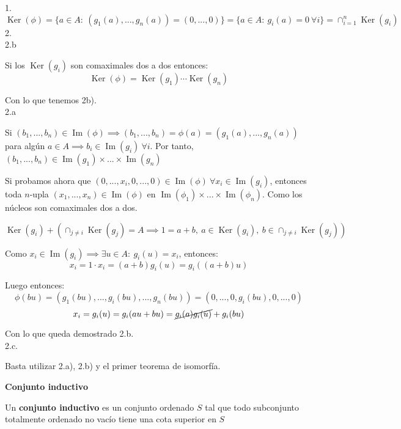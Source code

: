 \documentclass[openany]{book}
\begin{document}
\begin{demonstration}    
    1.
    $$ \operatorname{Ker}(\phi) = \{a \in A:\ (g_1(a),...,g_n(a)) = (0,...,0)\} = \{a \in A:\ g_i(a) = 0\ \forall i \} = \cap_{i=1}^{n}\operatorname{Ker}(g_i)$$
    2.\\2.b
    
    Si los $ \operatorname{Ker}(g_i) $ son comaximales dos a dos entonces:
    $$ \operatorname{Ker} (\phi) = \operatorname{Ker}(g_1)\cdots \operatorname{Ker}(g_n) $$

    Con lo que tenemos 2b).\\
    2.a

    Si $ (b_1,...,b_n)  \in \operatorname{Im}(\phi) \implies (b_1,...,b_n) = \phi(a) = (g_1(a),...,g_n(a))$ para algún $ a \in A \implies b_i \in \operatorname{Im}(g_i)\ \forall i$. Por tanto, $ (b_1,...,b_n) \in \operatorname{Im}(g_1)\times...\times \operatorname{Im}(g_n) $

    Si probamos ahora que $ (0,...,x_i,0,...,0) \in \operatorname{Im}(\phi)\ \forall  x_i \in \operatorname{Im}(g_i) $, entonces toda $n$-upla $(x_1,...,x_n) \in \operatorname{Im}(\phi)  $ en $ \operatorname{Im}(\phi_1)\times...\times \operatorname{Im}(\phi_n) $. Como los núcleos son comaximales dos a dos.

    $$ \operatorname{Ker}(g_i) + \left( \cap_{j\ne i} \operatorname{Ker}(g_j) = A \implies 1 = a+b,\ a \in \operatorname{Ker}(g_i),\ b \in \cap_{j\ne i} \operatorname{Ker}(g_j) \right) $$

    Como $ x_i \in \operatorname{Im}(g_i) \implies \exists u \in A:\ g_i(u) = x_i $, entonces:
    $$ x_i = 1\cdot x_i = (a+b) g_i(u) = g_i((a+b)u) $$

    Luego entonces:
    $$ \phi(bu) = (g_1(bu),...,g_i(bu),...,g_n(bu)) = (0,...,0,g_i(bu),0,...,0) $$
    $$ x_i = g_i(u) = g_i(au+bu) = \cancel{g_i(a)g_i(u)}+g_i(bu) $$
    
    Con lo que queda demostrado 2.b.\\
    2.c.

    Basta utilizar 2.a), 2.b) y el primer teorema de isomorfía.

\end{demonstration}

\begin{definition}
    \textbf{Conjunto inductivo}

    Un \textbf{conjunto inductivo} es un conjunto ordenado $ S $ tal que todo subconjunto totalmente ordenado no vacío tiene una cota superior en $ S $
\end{definition}
\end{document}
